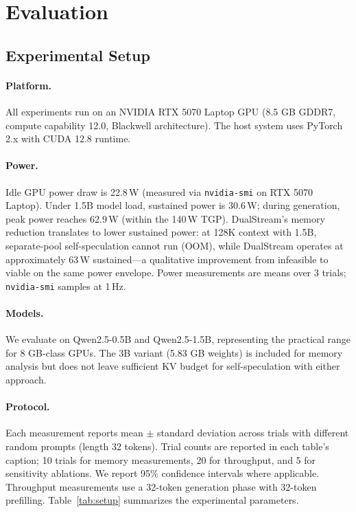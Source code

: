 \documentclass[review]{elsarticle}
\theoremstyle{definition}
\theoremstyle{remark}
\begin{document}
\section{Evaluation}

\subsection{Experimental Setup}

\paragraph{Platform.}
All experiments run on an NVIDIA RTX 5070 Laptop GPU (8.5 GB GDDR7,
compute capability 12.0, Blackwell architecture). The host system uses
PyTorch 2.x with CUDA 12.8 runtime.
\paragraph{Power.}
Idle GPU power draw is 22.8\,W (measured via \texttt{nvidia-smi} on RTX 5070
Laptop). Under 1.5B model load, sustained power is 30.6\,W; during generation,
peak power reaches 62.9\,W (within the 140\,W TGP). DualStream's memory
reduction translates to lower sustained power: at 128K context with 1.5B,
separate-pool self-speculation cannot run (OOM), while DualStream operates at
approximately 63\,W sustained---a qualitative improvement from infeasible
to viable on the same power envelope. Power measurements are means over 3
trials; \texttt{nvidia-smi} samples at 1\,Hz.

\paragraph{Models.}
We evaluate on Qwen2.5-0.5B and Qwen2.5-1.5B, representing the practical
range for 8 GB-class GPUs. The 3B variant (5.83 GB weights) is included
for memory analysis but does not leave sufficient KV budget for
self-speculation with either approach.

\paragraph{Protocol.}
Each measurement reports mean $\pm$ standard deviation across trials
with different random prompts (length 32 tokens). Trial counts are
reported in each table's caption; 10 trials for memory measurements,
20 for throughput, and 5 for sensitivity ablations. We report 95\%
confidence intervals where applicable. Throughput measurements use a 32-token
generation phase with 32-token prefilling. Table~\ref{tab:setup} summarizes
the experimental parameters.
\end{document}

